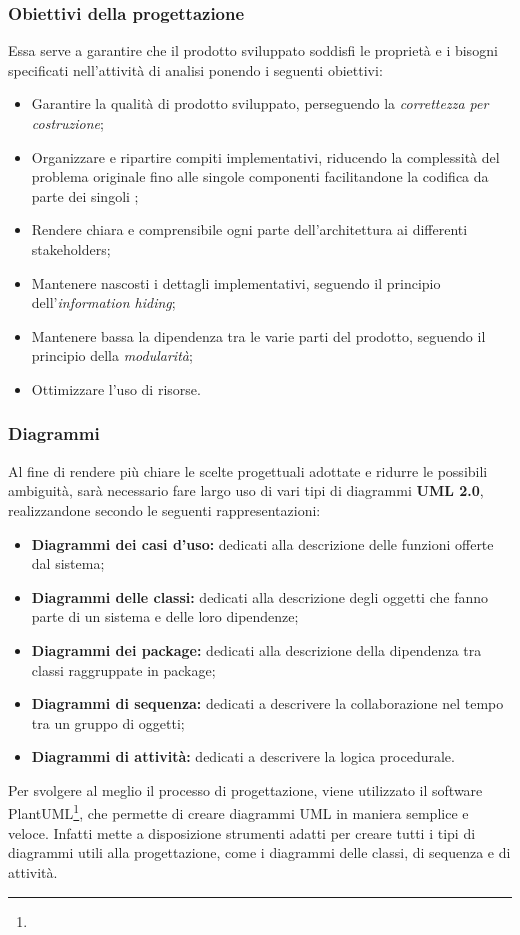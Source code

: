 \documentclass[NormeDiProgetto.tex]{subfiles}
\begin{document}
\subsubsection{Obiettivi della progettazione}
Essa serve a garantire che il prodotto sviluppato soddisfi le proprietà e i bisogni specificati nell'attività di analisi ponendo i seguenti obiettivi:
\begin{itemize}
	\item Garantire la qualità di prodotto sviluppato, perseguendo la \textit{correttezza per costruzione};
	\item Organizzare e ripartire compiti implementativi, riducendo la
	complessità del problema originale fino alle singole componenti
	facilitandone la codifica da parte dei singoli \progri;
	\item Rendere chiara e comprensibile ogni parte dell'architettura ai differenti stakeholders;
	\item Mantenere nascosti i dettagli implementativi, seguendo il principio dell'\textit{information hiding};
	\item Mantenere bassa la dipendenza tra le varie parti del prodotto, seguendo il principio della \textit{modularità};
	\item Ottimizzare l'uso di risorse.
\end{itemize}

\subsubsection{Diagrammi}
Al fine di rendere più chiare le scelte progettuali adottate e
ridurre le possibili ambiguità, sarà necessario fare largo uso di vari tipi di diagrammi 
\textbf{UML 2.0}, realizzandone secondo le seguenti rappresentazioni:
\begin{itemize}
	\item \textbf{Diagrammi dei casi d'uso:} dedicati alla descrizione delle funzioni offerte dal sistema;
	\item \textbf{Diagrammi delle classi:} dedicati alla descrizione degli oggetti che fanno parte di un sistema e delle loro dipendenze;
	\item \textbf{Diagrammi dei package:} dedicati alla descrizione della dipendenza tra classi raggruppate in package;
	\item \textbf{Diagrammi di sequenza:} dedicati a descrivere la collaborazione nel tempo tra un gruppo di oggetti;
	\item \textbf{Diagrammi di attività:} dedicati a descrivere la logica procedurale.
\end{itemize}
Per svolgere al meglio il processo di progettazione, viene utilizzato il software PlantUML\footnote{}, che permette di creare diagrammi UML in maniera semplice e veloce. Infatti mette a disposizione strumenti adatti per creare tutti i tipi di diagrammi utili alla progettazione, come i diagrammi delle classi, di sequenza e di attività.
\end{document}
